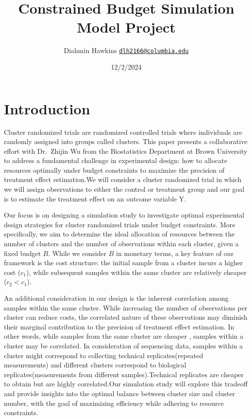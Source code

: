 \documentclass[
]{article}
\title{Constrained Budget Simulation Model Project}
\author{Diahmin Hawkins
\href{mailto:dlh2166@columbia.edu}{\nolinkurl{dlh2166@columbia.edu}}}
\date{12/2/2024}
\begin{document}
\maketitle

\hypertarget{introduction}{%
\section{Introduction}\label{introduction}}

Cluster randomized trials are randomized controlled trials where
individuals are randomly assigned into groups called clusters. This
paper presents a collaborative effort with Dr.~Zhijin Wu from the
Biostatistics Department at Brown University to address a fundamental
challenge in experimental design: how to allocate resources optimally
under budget constraints to maximize the precision of treatment effect
estimation.We will consider a cluster randomized trial in which we will
assign observations to either the control or treatment group and our
goal is to estimate the treatment effect on an outcome variable Y.

Our focus is on designing a simulation study to investigate optimal
experimental design strategies for cluster randomized trials under
budget constraints. More specifically, we aim to determine the ideal
allocation of resources between the number of clusters and the number of
observations within each cluster, given a fixed budget \(B\). While we
consider \(B\) in monetary terms, a key feature of our framework is the
cost structure: the initial sample from a cluster incurs a higher cost
(\(c_1\)), while subsequent samples within the same cluster are
relatively cheaper (\(c_2 < c_1\)).

An additional consideration in our design is the inherent correlation
among samples within the same cluster. While increasing the number of
observations per cluster can reduce costs, the correlated nature of
these observations may diminish their marginal contribution to the
precision of treatment effect estimation. In other words, while samples
from the same cluster are cheaper , samples within a cluster may be
correlated. In consideration of sequencing data, samples within a
cluster might correspond to collecting technical replicates(repeated
measurements) and different clusters correspond to biological
replicates(measurements from different samples).Technical replicates are
cheaper to obtain but are highly correlated.Our simulation study will
explore this tradeoff and provide insights into the optimal balance
between cluster size and cluster number, with the goal of maximizing
efficiency while adhering to resource constraints.
\end{document}

